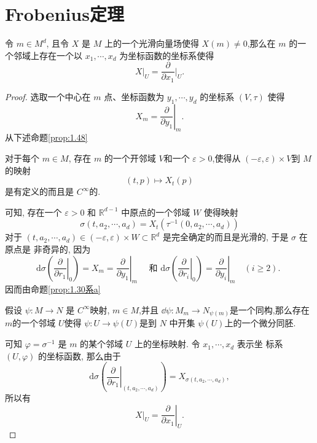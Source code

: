 \section{Frobenius定理}\label{thm:frobenius 1 denmension}
\begin{thm}
    令 $m\in M^d$, 且令 $X$ 是 $M$ 上的一个光滑向量场使得 $X(m)\neq 0$,那么在 $m$ 的一个邻域上存在一个以 $x_1,\cdots,x_d$ 为坐标函数的坐标系使得
    \begin{equation}
        X\big|_U =\frac{\partial}{\partial x_1}\bigg|_U.
    \end{equation}
\end{thm}
\begin{proof}
    选取一个中心在 $m$ 点、坐标函数为 $y_1, \cdots, y_d$ 的坐标系 $(V, \tau)$ 使得
\begin{equation}\label{eq:1.5}
X_m=\left.\frac{\partial}{\partial y_1}\right|_m .
\end{equation}
从下述命题\ref{prop:1.48}
\begin{prop}\label{prop:1.48}
    对于每个 $m\in M$, 存在 $m$ 的一个开邻域 $V$和一个 $\varepsilon>0$,使得从 $(-\varepsilon,\varepsilon)\times V$到 $M$的映射
    \begin{equation}
        (t,p)\mapsto X_t (p)
    \end{equation}
    是有定义的而且是 $C^\infty$的.
\end{prop}
可知, 存在一个 $\varepsilon>0$ 和 $\mathbb{R}^{d-1}$ 中原点的一个邻域 $W$ 使得映射
$$
\sigma\left(t, a_2, \cdots, a_d\right)=X_t\left(\tau^{-1}\left(0, a_2, \cdots, a_d\right)\right)
$$
对于 $\left(t, a_2, \cdots, a_d\right) \in(-\varepsilon, \varepsilon) \times W \subset \mathbb{R}^d$ 是完全确定的而且是光滑的, 于是 $\sigma$ 在原点是 非奇异的, 因为
$$
\mathrm{d} \sigma\left(\left.\frac{\partial}{\partial r_1}\right|_0\right)=X_m=\left.\frac{\partial}{\partial y_1}\right|_m \quad \text { 和 } \mathrm{d} \sigma\left(\left.\frac{\partial}{\partial r_i}\right|_0\right)=\left.\frac{\partial}{\partial y_i}\right|_m \quad(i \geqslant 2) \text {. }
$$
因而由命题\ref{prop:1.30系a}
\begin{prop}\label{prop:1.30系a}
    假设 $\psi\colon M\to N$ 是 $C^\infty$映射, $m\in M$,并且 $\dd \psi\colon M_m\to N_{\psi(m)}$是一个同构,那么存在 $m$的一个邻域 $U$使得 $\psi\colon U\to \psi(U)$是到 $N$ 中开集 $\psi(U)$上的一个微分同胚.
\end{prop}
可知 $\varphi=\sigma^{-1}$ 是 $m$ 的某个邻域 $U$ 上的坐标映射. 令 $x_1, \cdots, x_d$ 表示坐 标系 $(U, \varphi)$ 的坐标函数, 那么由于
$$
\mathrm{d} \sigma\left(\left.\frac{\partial}{\partial r_1}\right|_{\left(t, a_2, \cdots, a_d\right)}\right)=X_{\sigma\left(t, a_2, \cdots, a_d\right)},
$$
所以有
$$
\left.X\right|_U=\left.\frac{\partial}{\partial x_1}\right|_U .
$$
\end{proof}
